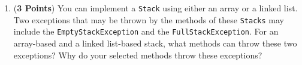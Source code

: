 \documentclass[12pt]{article}
\begin{document}
\begin{enumerate}
\begin{enumerate}
          \item ({\bf 3 Points}) You can implement a {\tt Stack} using either an array or a linked list. Two exceptions
            that may be thrown by the methods of these {\tt Stacks} may include the {\tt EmptyStackException} and
            the {\tt FullStackException}.  For an array-based and a linked list-based stack, what methods can throw
            these two exceptions?  Why do your selected methods throw these exceptions?
            

        \end{enumerate}

        \newpage







\end{enumerate}
\end{document}
